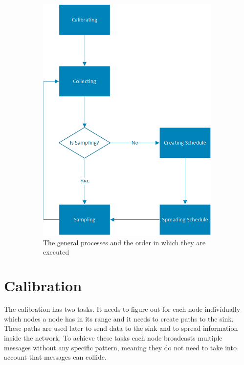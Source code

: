 \begin{figure}[]
\begin{subfigure}[t]{0.4\textwidth}
        \includegraphics[scale=0.7]{content/images/GeneralAproachM}
        \caption{The general processes and the order in which they are executed}
        \label{fig:processes}
    \end{subfigure}
    \caption{}
\end{figure}
  
\section{Calibration}
\label{chp:apr_calibration}
The calibration has two tasks. It needs to figure out for each node individually which nodes a node has in its range and it needs to create paths to the sink. These paths are used later to send data to the sink and to spread information inside the network. To achieve these tasks each node broadcasts multiple messages without any specific pattern, meaning they do not need to take into account that messages can collide.

